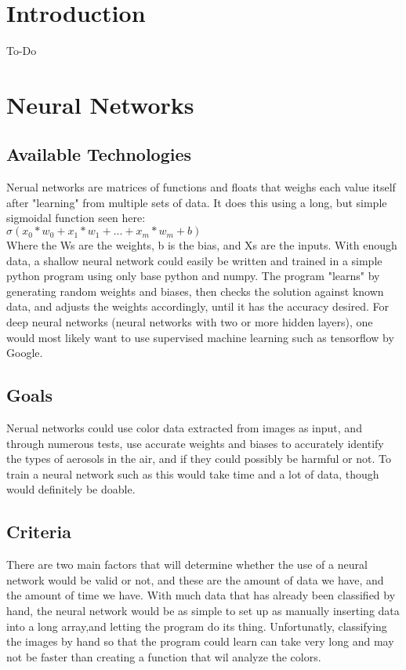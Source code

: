 \documentclass[onecolumn, draftclsnofoot,10pt, compsoc]{IEEEtran}
\begin{document}
\begin{flushleft}

\section{Introduction}

To-Do


\section{Neural Networks}
\subsection{Available Technologies}
Nerual networks are matrices of functions and floats that weighs each value itself after "learning" from multiple sets of data. It does this using a long, but simple sigmoidal function seen here:\\
$\sigma(x_0*w_0 + x_1*w_1 + ... + x_m*w_m + b)$\\
Where the Ws are the weights, b is the bias, and Xs are the inputs. 
With enough data, a shallow neural network could easily be written and trained in a simple python program using only base python and numpy. The program "learns" by generating random weights and biases, then checks the solution against known data, and adjusts the weights accordingly, until it has the accuracy desired. For deep neural networks (neural networks with two or more hidden layers), one would most likely want to use supervised machine learning such as tensorflow by Google. 

\subsection{Goals}
Nerual networks could use color data extracted from images as input, and through numerous tests, use accurate weights and biases to accurately identify the types of aerosols in the air, and if they could possibly be harmful or not. To train a neural network such as this would take time and a lot of data, though would definitely be doable. 


\subsection{Criteria}
There are two main factors that will determine whether the use of a neural network would be valid or not, and these are the amount of data we have, and the amount of time we have. With much data that has already been classified by hand, the neural network would be as simple to set up as manually inserting data into a long array,and letting the program do its thing. Unfortunatly, classifying the images by hand so that the program could learn can take very long and may not be faster than creating a function that wil analyze the colors. 

\end{flushleft}
\end{document}
